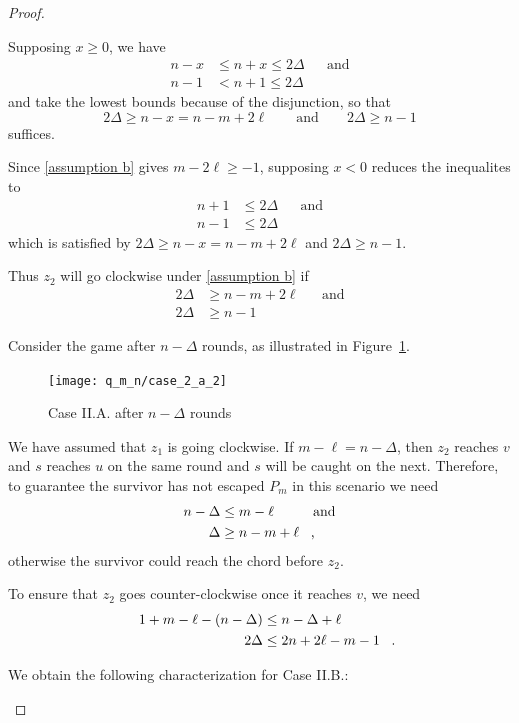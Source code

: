 \begin{proof}
\begin{proofpart}
\begin{itemize}
  Supposing $x\geq 0$, we have
  \begin{align*}
   n-x &\leq n+x \leq 2 \Delta && \text{and} \\
   n-1 &< n+1 \leq 2 \Delta
  \end{align*}
  and take the lowest bounds because of the disjunction, so that
   \[2\Delta \geq n-x = n-m+2\ell \qquad \text{and} \qquad 2\Delta \geq n-1\]
    suffices.

  Since \ref{assumption b} gives $m-2\ell \geq -1$, supposing $x < 0$ reduces the inequalites to
  \begin{align*}
   n+1 &\leq 2 \Delta && \text{and} \\
   n-1 &\leq 2 \Delta
  \end{align*}
  which is satisfied by $2\Delta \geq n-x = n-m+2\ell$ and $2\Delta \geq n-1$.

  Thus $z_2$ will go clockwise under \ref{assumption b} if
  \begin{align*}
   2\Delta &\geq n-m+2\ell && \text{and} \\
    2\Delta &\geq n-1
  \end{align*}

  Consider the game after $n-\Delta$ rounds, as illustrated in Figure~\ref{fig:case_2_a_2}.

  \begin{figure}
    \centering
    \texttt{[image: q\_m\_n/case\_2\_a\_2]}
    \caption{Case II.A. after $n-\Delta$ rounds \label{fig:case_2_a_2}}
  \end{figure}

  We have assumed that $z_1$ is going clockwise. If $m - \ell = n - \Delta$,
  then $z_2$ reaches $v$ and $s$ reaches $u$ on the same round and $s$
  will be caught on the next. Therefore, to guarantee the survivor has not
  escaped $P_m$ in this scenario we need
  \begin{align*}
   n - \Delta &\leq m - \ell   && \text{and}  \\
   \Delta &\geq n - m + \ell \mcomma
  \end{align*}
  otherwise the survivor could reach the chord before $z_2$.

  To ensure that $z_2$ goes counter-clockwise once it reaches $v$, we need
  \begin{align*}
   1 + m - \ell - (n - \Delta) &\leq n - \Delta + \ell  \\
   2 \Delta &\leq 2n + 2\ell - m - 1 \mperiod
  \end{align*}

  We obtain the following characterization for Case II.B.:


\end{itemize}
\end{proofpart}
\end{proof}
